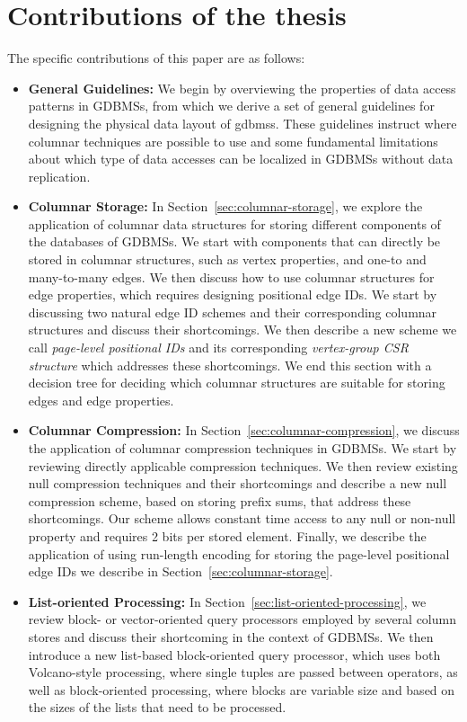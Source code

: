 \section{Contributions of the thesis}

The specific contributions of this paper are as follows:

\begin{itemize}
	\item {\bf General Guidelines:} We begin by overviewing the properties of data access patterns in GDBMSs, from which we derive a set of general guidelines for designing the physical data layout of \gls{gdbms}s. These guidelines instruct where columnar techniques are possible to use and some fundamental limitations about which type of data accesses can be localized in GDBMSs without data replication.
	
	
	
	\item {\bf Columnar Storage:} In Section~\ref{sec:columnar-storage}, we explore  the application of columnar data structures for storing different components of the databases of GDBMSs. We start with components that can directly be stored in columnar structures, such as vertex properties, and one-to and many-to-many edges. We then discuss how to use columnar structures for edge properties, which requires designing positional edge IDs. We start by discussing two natural edge ID schemes and their corresponding columnar structures and discuss their shortcomings. We then describe a new scheme we call {\em page-level positional IDs} and its corresponding {\em vertex-group CSR structure} which addresses these shortcomings. We end this section with a decision tree for deciding which columnar structures are suitable for storing edges and edge properties.  
	\item {\bf Columnar Compression:} In Section~\ref{sec:columnar-compression}, we discuss the application of columnar compression techniques in GDBMSs. We start by reviewing directly applicable compression techniques. We then review existing null compression techniques and their shortcomings and describe a new null compression scheme, based on storing prefix sums, that address these shortcomings. Our scheme allows constant time access to any null or non-null property and requires 2 bits per stored element. Finally, we describe the application of using run-length encoding for storing the page-level positional edge IDs we describe in Section~\ref{sec:columnar-storage}. 
	\item {\bf List-oriented Processing:} In Section~\ref{sec:list-oriented-processing}, we review block- or vector-oriented query processors employed by several column stores and discuss their shortcoming in the context of GDBMSs. We then introduce a new list-based block-oriented query processor, which uses both Volcano-style processing, where single tuples are passed between operators, as well as block-oriented processing, where blocks are variable size and based on the sizes of the lists that need to be processed. 
	

\end{itemize}

